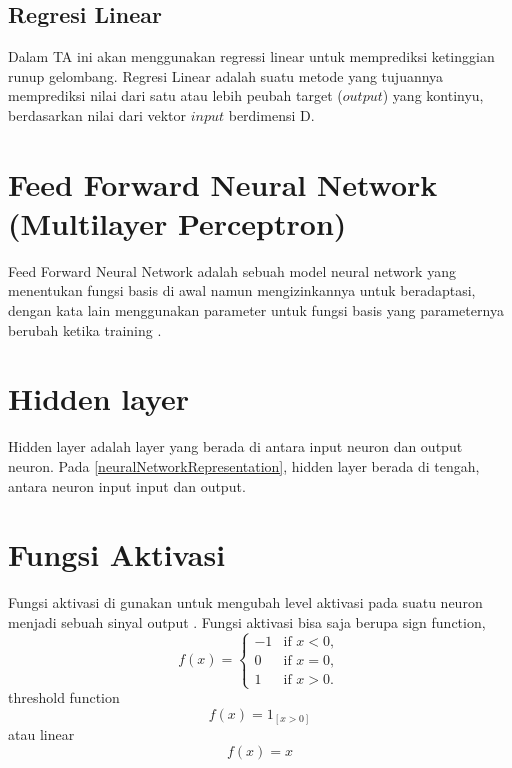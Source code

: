\subsection{Regresi Linear}
    Dalam TA ini akan menggunakan regressi linear untuk memprediksi ketinggian runup gelombang. Regresi Linear adalah suatu metode yang tujuannya memprediksi nilai dari satu atau lebih peubah target ($output$) yang kontinyu, berdasarkan nilai dari vektor $input$ berdimensi D\cite{MLBishop}.
\section{Feed Forward Neural Network (Multilayer Perceptron)}
    Feed Forward Neural Network adalah sebuah model neural network yang menentukan fungsi basis di awal namun mengizinkannya untuk beradaptasi, dengan kata lain menggunakan parameter untuk fungsi basis yang parameternya berubah ketika training \cite{MLBishop}.

\section{Hidden layer}
    Hidden layer adalah layer yang berada di antara input neuron dan output neuron\cite{ShaiUnderstandingMachineLearning}. Pada \ref{neuralNetworkRepresentation}, hidden layer berada di tengah, antara neuron input input dan output. 
\section{Fungsi Aktivasi}
    Fungsi aktivasi di gunakan untuk mengubah level aktivasi pada suatu neuron menjadi sebuah sinyal output \cite{KarlicOlgacPerformanceAnalysis}. Fungsi aktivasi bisa saja berupa sign function,
    \begin{equation}
        f(x) =
        \begin{cases}
            -1 & \text{if } x < 0, \\
            0 & \text{if } x = 0, \\
            1 & \text{if } x > 0.
        \end{cases}
    \end{equation}
    threshold function
    \begin{equation}
        f(x) = 1_{[x>0]}
    \end{equation}
    \begin{equation}
    \end{equation}
    atau linear
    \begin{equation}
        f(x) = x
    \end{equation}
